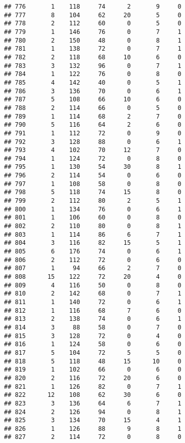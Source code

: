 \documentclass[
]{article}
\begin{document}
\begin{verbatim}
## 776       1    118     74      2       9     0
## 777       8    104     62     20       5     0
## 778       2    112     60      0       5     0
## 779       1    146     76      0       7     1
## 780       2    150     48      0       8     1
## 781       1    138     72      0       7     1
## 782       2    118     68     10       6     0
## 783       3    132     96      0       7     1
## 784       1    122     76      0       8     0
## 785       4    142     40      0       5     1
## 786       3    136     70      0       6     1
## 787       5    108     66     10       6     0
## 788       2    114     66      0       5     0
## 789       1    114     68      2       7     0
## 790       5    116     64      2       6     0
## 791       1    112     72      0       9     0
## 792       3    128     88      0       6     1
## 793       4    102     70     12       7     0
## 794       1    124     72      0       8     0
## 795       1    130     54     30       8     1
## 796       2    114     54      0       6     0
## 797       1    108     58      0       8     0
## 798       5    118     74     15       8     0
## 799       2    112     80      2       5     1
## 800       1    134     76      0       6     1
## 801       1    106     60      0       8     0
## 802       2    110     80      0       8     1
## 803       1    114     86      6       7     1
## 804       3    116     82     15       5     1
## 805       6    176     74      0       6     1
## 806       2    112     72      0       6     0
## 807       1     94     66      2       7     0
## 808      15    122     72     20       4     0
## 809       4    116     50      0       8     0
## 810       2    142     68      0       7     1
## 811       1    140     72      0       6     1
## 812       1    116     68      7       6     0
## 813       2    138     74      0       6     1
## 814       3     88     58      0       7     0
## 815       3    128     72      0       4     0
## 816       1    124     58      0       6     0
## 817       5    104     72      5       5     0
## 818       5    118     48     15      10     0
## 819       1    102     66      0       6     0
## 820       2    116     72     20       6     0
## 821       1    126     82      0       7     1
## 822      12    108     62     30       6     0
## 823       3    136     64      6       7     1
## 824       2    126     94      0       8     1
## 825       3    134     70     15       4     1
## 826       1    126     88      9       8     1
## 827       2    114     72      0       8     0

\end{verbatim}
\end{document}
